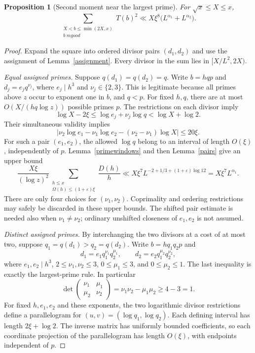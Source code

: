 \documentclass[11pt,a4paper]{article}
\newtheorem{proposition}[theorem]{Proposition}
\newcommand{\Om}{\Omega}
\begin{document}
\begin{proposition}[Second moment near the largest prime]\label{second}
For $\sqrt x\le X\le x$,
\[
 \sum_{\substack{X<b\le\min(2X,x)\\b\ {
m good}}}T(b)^2
 \ll X\xi^8\big(L^{\alpha_1}+L^{\alpha_2}\big).
\]
\end{proposition}
\begin{proof}
Expand the square into ordered divisor pairs $(d_1,d_2)$ and use
the assignment of Lemma~\ref{assignment}. Every divisor in the sum
lies in $[X/L^2,2X)$.

\emph{Equal assigned primes.}
Suppose $q(d_1)=q(d_2)=q$. Write $b=hqp$ and
$d_j=e_jq^{\nu_j}$, where $e_j\mid h^3$ and
$\nu_j\in\{2,3\}$. This is legitimate because all primes above $z$
occur to exponent one in $b$, and $q<p$.
For fixed $h,q$, there are at most
$O(X/(hq\log z))$ possible primes $p$.
The restrictions on each divisor imply
\[
 \log X-2\xi\le\log e_j+\nu_j\log q<\log X+\log2.
\]
Their simultaneous validity implies
\[
 |\nu_2\log e_1-\nu_1\log e_2
       -(\nu_2-\nu_1)\log X|\le20\xi.
\]
For such a pair $(e_1,e_2)$, the allowed $\log q$ belong to an
interval of length $O(\xi)$, independently of $p$.
Lemma~\ref{primewindows} and then Lemma~\ref{pairs} give an upper
bound
\[
 \frac{X\xi}{(\log z)^2}
 \sum_{\substack{h\le x\\\Om(h)\le(1+\varepsilon)\xi}}
       \frac{D(h)}h
 \ll X\xi^7 L^{-2+1/3+(1+\varepsilon)\log12}
 =X\xi^7L^{\alpha_1}.
\]
There are only four choices for $(\nu_1,\nu_2)$. Coprimality and
ordering restrictions may safely be discarded in these upper bounds.
The shifted pair estimate is needed also when $\nu_1\ne\nu_2$;
ordinary unshifted closeness of $e_1,e_2$ is not assumed.

\emph{Distinct assigned primes.}
By interchanging the two divisors at a cost of at most two, suppose
$q_1=q(d_1)>q_2=q(d_2)$. Write $b=hq_1q_2p$ and
\[
 d_1=e_1q_1^{\nu_1}q_2^{\mu_1},\qquad
 d_2=e_2q_1^{\mu_2}q_2^{\nu_2},
\]
where $e_1,e_2\mid h^3$, $2\le\nu_1,\nu_2\le3$,
$0\le\mu_1\le3$, and $0\le\mu_2\le1$.
The last inequality is exactly the largest-prime rule. In particular
\[
 \det\begin{pmatrix}\nu_1&\mu_1\\\mu_2&\nu_2\end{pmatrix}
 =\nu_1\nu_2-\mu_1\mu_2\ge4-3=1.
\]
For fixed $h,e_1,e_2$ and these exponents, the two logarithmic divisor
restrictions define a parallelogram for
$(u,v)=(\log q_1,\log q_2)$. Each defining interval has length
$2\xi+\log2$. The inverse matrix has uniformly bounded coefficients,
so each coordinate projection of the parallelogram has length
$O(\xi)$, with endpoints independent of $p$.


\end{proof}
\end{document}
